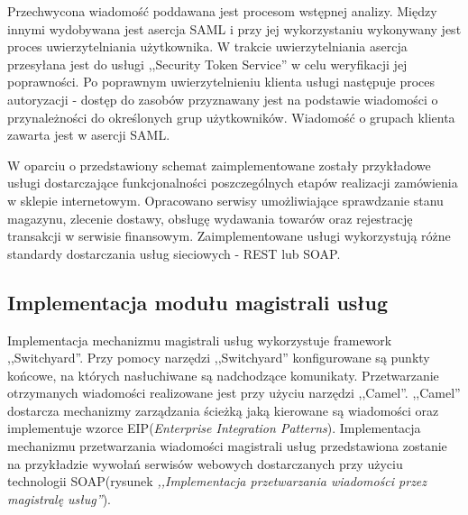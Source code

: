 	Przechwycona wiadomość poddawana jest procesom wstępnej analizy. Między innymi wydobywana jest asercja SAML i przy jej wykorzystaniu wykonywany jest proces uwierzytelniania użytkownika. W trakcie uwierzytelniania asercja przesyłana jest do usługi ,,Security Token Service'' w celu weryfikacji jej poprawności. Po poprawnym uwierzytelnieniu klienta usługi następuje proces autoryzacji - dostęp do zasobów przyznawany jest na podstawie wiadomości o przynależności do określonych grup użytkowników. Wiadomość o grupach klienta zawarta jest w asercji SAML.

	W oparciu o przedstawiony schemat zaimplementowane zostały przykładowe usługi dostarczające funkcjonalności poszczególnych etapów realizacji zamówienia w sklepie internetowym. Opracowano serwisy umożliwiające sprawdzanie stanu magazynu, zlecenie dostawy, obsługę wydawania towarów oraz rejestrację transakcji w serwisie finansowym. Zaimplementowane usługi wykorzystują różne standardy dostarczania usług sieciowych - REST lub SOAP. 
	



\subsection{Implementacja modułu magistrali usług}

	Implementacja mechanizmu magistrali usług wykorzystuje framework ,,Switchyard''. Przy pomocy narzędzi ,,Switchyard'' konfigurowane są punkty końcowe, na których nasłuchiwane są nadchodzące komunikaty. Przetwarzanie otrzymanych wiadomości realizowane jest przy użyciu narzędzi ,,Camel''. ,,Camel'' dostarcza mechanizmy zarządzania ścieżką jaką kierowane są wiadomości oraz implementuje wzorce EIP(\textit{Enterprise Integration Patterns}). Implementacja mechanizmu przetwarzania wiadomości magistrali usług przedstawiona zostanie na przykładzie wywołań serwisów webowych dostarczanych przy użyciu technologii SOAP(rysunek \textit{,,Implementacja przetwarzania wiadomości przez magistralę usług''}).

